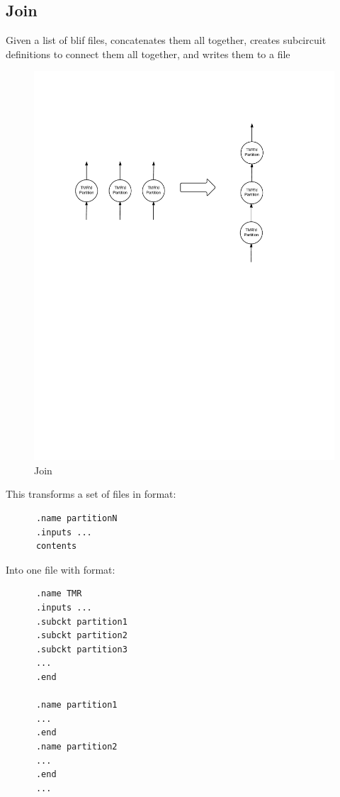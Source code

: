 \documentclass[12pt,final,oneside]{dwThesis} %
\begin{document}
   \newpage
   \subsection{Join}\label{algJoin}
   Given a list of blif files, concatenates them all together, creates
   subcircuit definitions to connect them all together, and writes them to a file
   \begin{figure}
      \begin{center}
         \includegraphics[width=\linewidth]{images/Join.pdf}
         \caption{Join}
         \label{imJoin}
      \end{center}
   \end{figure}

   This transforms a set of files in format:
   \begin{lstlisting}
      .name partitionN
      .inputs ...
      contents
   \end{lstlisting}
   Into one file with format:
   \begin{lstlisting}
      .name TMR
      .inputs ...
      .subckt partition1
      .subckt partition2
      .subckt partition3
      ...
      .end

      .name partition1
      ...
      .end
      .name partition2
      ...
      .end
      ...
   \end{lstlisting}
   \newpage
\end{document}
